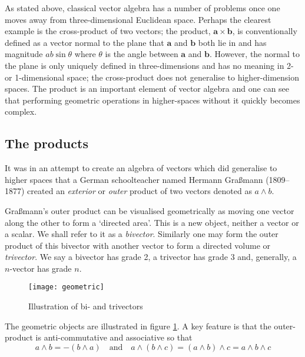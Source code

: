 As stated above, classical vector algebra has a number of problems
once one moves away from three-dimensional Euclidean space. Perhaps the
clearest example is the cross-product of two vectors; the product, $\mathbf{a}
\times \mathbf{b}$, is conventionally defined as a vector normal to the plane
that $\mathbf{a}$ and $\mathbf{b}$ both lie in and has magnitude $ab\sin\theta$
where $\theta$ is the angle between $\mathbf{a}$ and $\mathbf{b}$. However, the
normal to the plane is only uniquely defined in three-dimensions and has no meaning
in 2- or 1-dimensional space; the cross-product does not generalise to
higher-dimension spaces. The product is an important element of vector
algebra and one can see that performing geometric operations in higher-spaces
without it quickly becomes complex.

\subsection{The products}

It was in an attempt \cite{GA:grassmann} to create an algebra of vectors which 
did generalise
to higher spaces that a German schoolteacher named Hermann 
Gra{\ss}mann (1809--1877) created an \emph{exterior} 
or \emph{outer} product of two
vectors denoted as $a \wedge b$. 

Gra{\ss}mann's outer product can be visualised geometrically as moving
one vector along the other to form a `directed area'. This is a new object,
neither a vector or a scalar. We shall refer to it as a \emph{bivector}.
Similarly one may form the outer product of this bivector with another
vector to form a directed volume or \emph{trivector}. We say a 
bivector has grade 2, a trivector has grade 3 and, generally, a
$n$-vector has grade $n$.

\begin{figure}
\centering
\texttt{[image: geometric]}
\caption{Illustration of bi- and trivectors\label{fig:geometric}}
\end{figure}

The geometric objects are illustrated in figure \ref{fig:geometric}. A 
key feature is that the outer-product is anti-commutative and 
associative so that
\begin{displaymath}
a \wedge b = - ( b \wedge a)\quad\mbox{and}\quad 
a \wedge (b \wedge c) = (a \wedge b) \wedge c = a \wedge b \wedge c
\end{displaymath}

